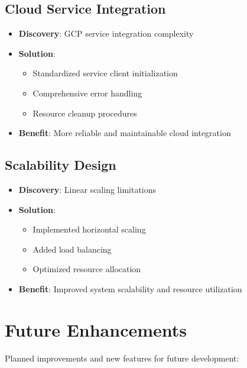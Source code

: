 \documentclass[12pt,a4paper]{report}
\begin{document}
\subsection{Cloud Service Integration}
\begin{itemize}
\item \textbf{Discovery}: GCP service integration complexity
\item \textbf{Solution}: 
    \begin{itemize}
        \item Standardized service client initialization
        \item Comprehensive error handling
        \item Resource cleanup procedures
    \end{itemize}
\item \textbf{Benefit}: More reliable and maintainable cloud integration
\end{itemize}

\subsection{Scalability Design}
\begin{itemize}
\item \textbf{Discovery}: Linear scaling limitations
\item \textbf{Solution}: 
    \begin{itemize}
        \item Implemented horizontal scaling
        \item Added load balancing
        \item Optimized resource allocation
    \end{itemize}
\item \textbf{Benefit}: Improved system scalability and resource utilization
\end{itemize}

\section{Future Enhancements}
Planned improvements and new features for future development:
\end{document}
